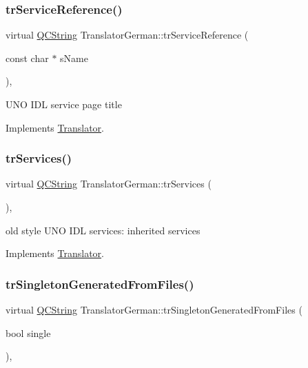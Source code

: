 \subsubsection{\texorpdfstring{trServiceReference()}{trServiceReference()}}
{\footnotesize\ttfamily virtual \mbox{\hyperlink{class_q_c_string}{Q\+C\+String}} Translator\+German\+::tr\+Service\+Reference (\begin{DoxyParamCaption}\item[{const char $\ast$}]{s\+Name }\end{DoxyParamCaption})\hspace{0.3cm}{\ttfamily [inline]}, {\ttfamily [virtual]}}

U\+NO I\+DL service page title 

Implements \mbox{\hyperlink{class_translator}{Translator}}.

\mbox{\label{class_translator_german_a3fb9881a750d81d7aed4642366aef532}} 
\subsubsection{\texorpdfstring{trServices()}{trServices()}}
{\footnotesize\ttfamily virtual \mbox{\hyperlink{class_q_c_string}{Q\+C\+String}} Translator\+German\+::tr\+Services (\begin{DoxyParamCaption}{ }\end{DoxyParamCaption})\hspace{0.3cm}{\ttfamily [inline]}, {\ttfamily [virtual]}}

old style U\+NO I\+DL services\+: inherited services 

Implements \mbox{\hyperlink{class_translator}{Translator}}.

\mbox{\label{class_translator_german_ae9a88a6bae43a58f68e0b9eb6e8f2401}} 
\subsubsection{\texorpdfstring{trSingletonGeneratedFromFiles()}{trSingletonGeneratedFromFiles()}}
{\footnotesize\ttfamily virtual \mbox{\hyperlink{class_q_c_string}{Q\+C\+String}} Translator\+German\+::tr\+Singleton\+Generated\+From\+Files (\begin{DoxyParamCaption}\item[{bool}]{single }\end{DoxyParamCaption})\hspace{0.3cm}{\ttfamily [inline]}, {\ttfamily [virtual]}}

